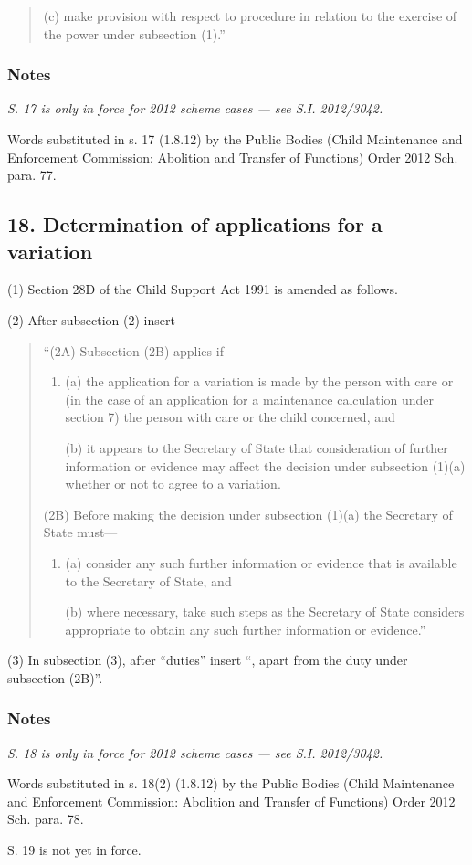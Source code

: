 \documentclass[a4paper]{article}
\newcommand\amendment[1]{\subsubsection*{Notes}{\itshape\frenchspacing\footnotesize #1 \par}}
\begin{document}
{\begin{quotation}
\begin{enumerate}
(c) make provision with respect to procedure in relation to the exercise of the power under subsection (1).”
\end{enumerate}
\end{quotation}

\amendment{
S. 17 is only in force for 2012 scheme cases --- see S.I. 2012/3042.

Words substituted in s. 17 (1.8.12) by the Public Bodies (Child Maintenance and Enforcement Commission: Abolition and Transfer of Functions) Order 2012 Sch. para. 77.

}

\subsection{18. Determination of applications for a variation}

(1) Section 28D of the Child Support Act 1991 is amended as follows.

(2) After subsection (2) insert—
\begin{quotation}
“(2A) Subsection (2B) applies if—
\begin{enumerate}\item[]
(a) the application for a variation is made by the person with care or (in the case of an application for a maintenance calculation under section 7) the person with care or the child concerned, and

(b) it appears to the Secretary of State that consideration of further information or evidence may affect the decision under subsection (1)(a) whether or not to agree to a variation.
\end{enumerate}

(2B) Before making the decision under subsection (1)(a) the Secretary of State must—
\begin{enumerate}\item[]
(a) consider any such further information or evidence that is available to the Secretary of State, and

(b) where necessary, take such steps as the Secretary of State considers appropriate to obtain any such further information or evidence.”
\end{enumerate}
\end{quotation}

(3) In subsection (3), after “duties” insert “, apart from the duty under subsection (2B)”.

\amendment{
S. 18 is only in force for 2012 scheme cases --- see S.I. 2012/3042.

Words substituted in s. 18(2) (1.8.12) by the Public Bodies (Child Maintenance and Enforcement Commission: Abolition and Transfer of Functions) Order 2012 Sch. para. 78.

\medskip

S. 19 is not yet in force.
}
}
\end{document}
